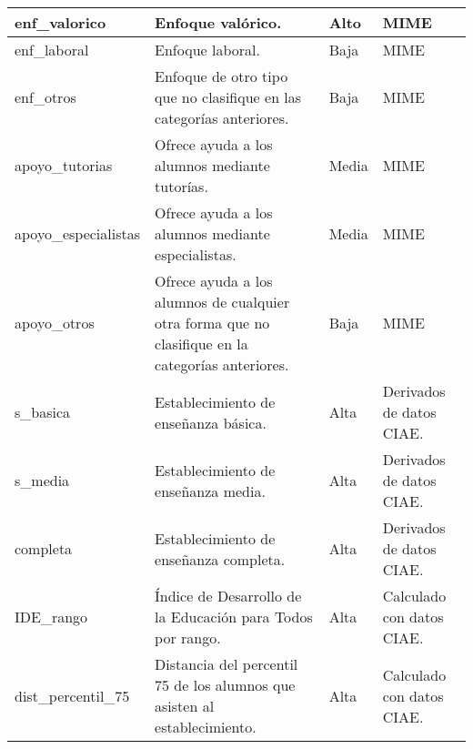 \begin{footnotesize}
\begin{longtable}{|p{}|p{}|p{}|p{}|}
enf\_valorico & Enfoque valórico. & Alto & MIME \\ \hline
enf\_laboral & Enfoque laboral. & Baja & MIME \\ \hline
enf\_otros & Enfoque de otro tipo que no clasifique en las categorías anteriores. & Baja & MIME \\ \hline
apoyo\_tutorias & Ofrece ayuda a los alumnos mediante tutorías. & Media & MIME \\ \hline
apoyo\_especialistas & Ofrece ayuda a los alumnos mediante especialistas. & Media & MIME \\ \hline
apoyo\_otros & Ofrece ayuda a los alumnos de cualquier otra forma que no clasifique en la categorías anteriores. & Baja & MIME \\ \hline
s\_basica & Establecimiento de enseñanza básica. & Alta & Derivados de datos CIAE. \\ \hline
s\_media & Establecimiento de enseñanza media. & Alta & Derivados de datos CIAE. \\ \hline
completa & Establecimiento de enseñanza completa. & Alta & Derivados de datos CIAE. \\ \hline
IDE\_rango & Índice de Desarrollo de la Educación para Todos por rango. & Alta & Calculado con datos CIAE. \\ \hline
dist\_percentil\_75 & Distancia del percentil 75 de los alumnos que asisten al establecimiento. & Alta & Calculado con datos CIAE.\\ \hline
\end{longtable} 
\end{footnotesize}

